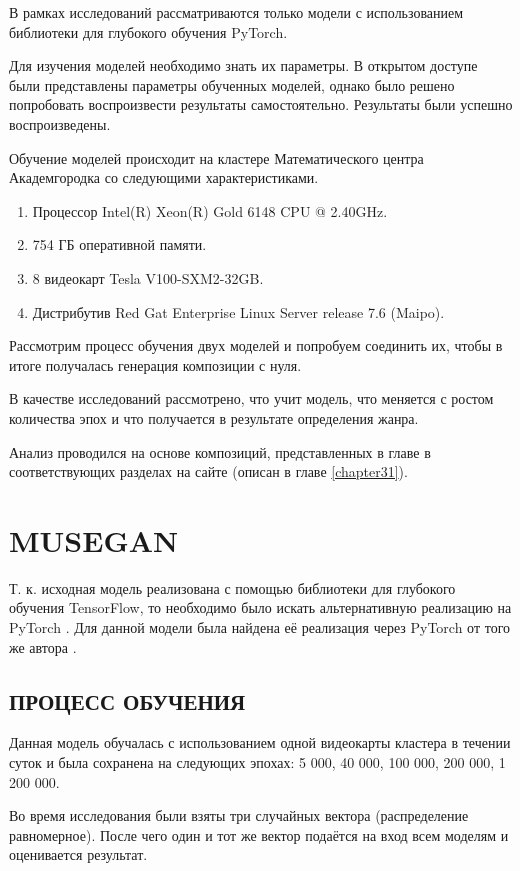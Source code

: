 В рамках исследований рассматриваются только модели с использованием библиотеки для глубокого обучения PyTorch. 

Для изучения моделей необходимо знать их параметры. В открытом доступе были представлены параметры обученных моделей, однако было решено попробовать воспроизвести результаты самостоятельно. Результаты были успешно воспроизведены.  

Обучение моделей происходит на кластере Математического центра Академгородка со следующими характеристиками.
\begin{enumerate}
    \item Процессор Intel(R) Xeon(R) Gold 6148 CPU @ 2.40GHz.
    \item 754 ГБ оперативной памяти.
    \item 8 видеокарт Tesla V100-SXM2-32GB.
    \item Дистрибутив Red Gat Enterprise Linux Server release 7.6 (Maipo).
\end{enumerate}

Рассмотрим процесс обучения двух моделей и попробуем соединить их, чтобы в итоге получалась генерация композиции с нуля.

В качестве исследований рассмотрено, что учит модель, что меняется с ростом количества эпох и что получается в результате определения жанра.

Анализ проводился на основе композиций, представленных в главе в соответствующих разделах на сайте (описан в главе \ref{chapter31}).

\section{MUSEGAN}
Т. к. исходная модель реализована с помощью библиотеки для глубокого обучения TensorFlow, то необходимо было искать альтернативную реализацию на PyTorch \cite{musegan}. Для данной модели была найдена её реализация через PyTorch от того же автора \cite{muse-torch}. 

\subsection{ПРОЦЕСС ОБУЧЕНИЯ}
Данная модель обучалась с использованием одной видеокарты кластера в течении суток и была сохранена на следующих эпохах: 5 000, 40 000, 100 000, 200 000, 1 200 000.

Во время исследования были взяты три случайных вектора (распределение равномерное). После чего один и тот же вектор подаётся на вход всем моделям и оценивается результат.

